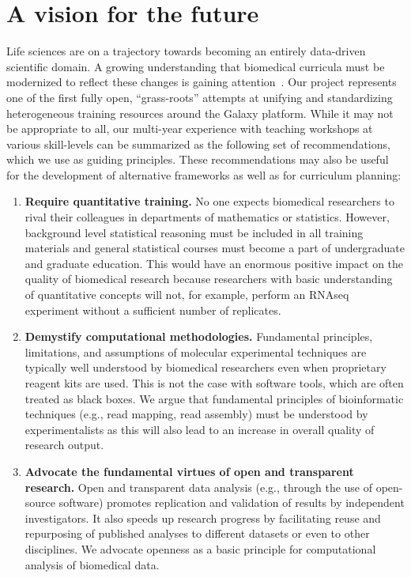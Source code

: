 \section*{A vision for the future}
Life sciences are on a trajectory towards becoming an entirely data-driven scientific domain. A growing understanding that biomedical curricula must be modernized to reflect these changes is gaining attention~\cite{10.7554/eLife.32715}. Our project represents one of the first fully open, “grass-roots” attempts at unifying and standardizing heterogeneous training resources around the Galaxy platform. While it may not be appropriate to all, our multi-year experience with teaching workshops at various skill-levels can be summarized as the following set of recommendations, which we use as guiding principles. These recommendations may also be useful for the development of alternative frameworks as well as for curriculum planning:

\begin{enumerate}
\item \textbf{Require quantitative training.} No one expects biomedical researchers to rival their colleagues in departments of mathematics or statistics. However, background level statistical reasoning must be included in all training materials and general statistical courses must become a part of undergraduate and graduate education. This would have an enormous positive impact on the quality of biomedical research because researchers with basic understanding of quantitative concepts will not, for example, perform an RNAseq experiment without a sufficient number of replicates.
\item \textbf{Demystify computational methodologies.} Fundamental principles, limitations, and assumptions of molecular experimental techniques are typically well understood by biomedical researchers even when proprietary reagent kits are used. This is not the case with software tools, which are often treated as black boxes. We argue that fundamental principles of bioinformatic techniques (e.g., read mapping, read assembly) must be understood by experimentalists as this will also lead to an increase in overall quality of research output.
\item \textbf{Advocate the fundamental virtues of open and transparent research.} Open and transparent data analysis (e.g., through the use of open-source software) promotes replication and validation of results by independent investigators. It also speeds up research progress by facilitating reuse and repurposing of published analyses to different datasets or even to other disciplines. We advocate openness as a basic principle for computational analysis of biomedical data.
\end{enumerate}

